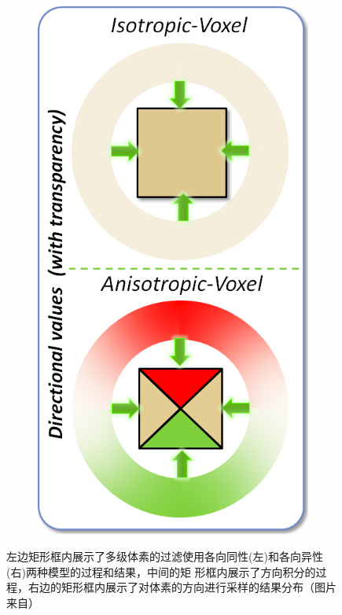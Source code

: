\begin{figure}
\begin{fullwidth}
\begin{subfigure}[b]{0.215\thewidth}
		\includegraphics[width=\textwidth]{figures/vct/vct-5-2}
	\end{subfigure}
	\caption{左边矩形框内展示了多级体素的过滤使用各向同性(左)和各向异性(右)两种模型的过程和结果，中间的矩 形框内展示了方向积分的过程，右边的矩形框内展示了对体素的方向进行采样的结果分布（图片来自\cite{a:InteractiveIndirectIlluminationUsingVoxelConeTracing}）}
	\label{f:vct-5}
\end{fullwidth}
\end{figure}


